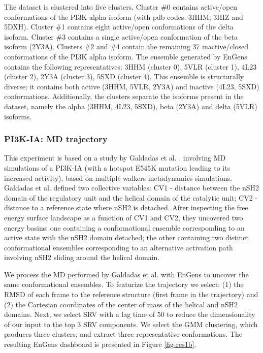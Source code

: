 \documentclass[unnumsec,webpdf,contemporary,large,numsquare]{oup-authoring-template}%
\theoremstyle{thmstyleone}%
\theoremstyle{thmstyletwo}%
\theoremstyle{thmstylethree}%
\begin{document}
The dataset is clustered into five clusters. Cluster \#0 contains active/open conformations of the PI3K alpha isoform (with pdb codes: 3HHM, 3HIZ and 5DXH). Cluster \#1 contains eight active/open conformations of the delta isoform. Cluster \#3 contains a single active/open conformation of the beta isoform (2Y3A). Clusters \#2 and \#4 contain the remaining 37 inactive/closed conformations of the PI3K alpha isoform. The ensemble generated by EnGens contains the following representatives: 3HHM (cluster 0), 5VLR (cluster 1), 4L23 (cluster 2), 2Y3A (cluster 3),  5SXD (cluster 4). This ensemble is structurally diverse; it contains both active (3HHM, 5VLR, 2Y3A) and inactive (4L23, 5SXD) conformations. Additionally, the clusters separate the isoforms present in the dataset, namely the alpha (3HHM, 4L23, 5SXD), beta (2Y3A) and delta (5VLR) isoforms. 


\subsubsection{PI3K-IA: MD trajectory}


This experiment is based on a study by Galdadas et al. \citep{galdadas_unravelling_2020}, involving MD simulations of a PI3K-IA (with a hotspot E545K mutation leading to its increased activity), based on multiple walkers metadynamics simulations. Galdadas et al.  defined two collective variables: CV1 - distance between the nSH2 domain of the regulatory unit and the helical domain of the catalytic unit; CV2 - distance to a reference state where nSH2 is detached. After inspecting the free energy surface landscape as a function of CV1 and CV2, they uncovered two energy basins: one containing a conformational ensemble corresponding to an active state with the nSH2 domain detached; the other containing two distinct conformational ensembles corresponding to an alternative activation path involving nSH2 sliding around the helical domain.

We process the MD performed by Galdadas et al. with EnGens to uncover the same conformational ensembles. To featurize the trajectory we select: (1) the RMSD of each frame to the reference structure (first frame in the trajectory) and (2) the Cartesian coordinates of the center of mass of the helical and nSH2 domains. Next, we select SRV with a lag time of 50 to reduce the dimensionality of our input to the top 3 SRV components. We select the GMM clustering, which produces three clusters, and extract three representative conformations. The resulting EnGens dashboard is presented in Figure \ref{fig-res1b}. 
\end{document}
